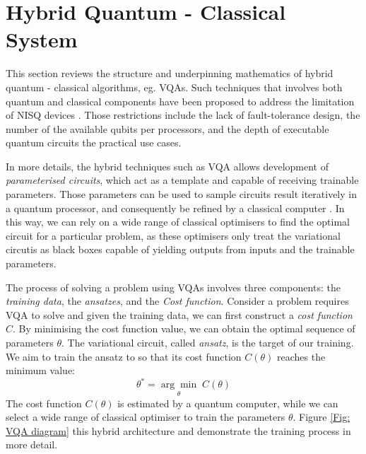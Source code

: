 \section{Hybrid Quantum - Classical System} \label{Sec: Hybrid Quantum - Classical System}

This section reviews the structure and underpinning mathematics of hybrid quantum - classical algorithms, eg. VQAs.
Such techniques that involves both quantum and classical components have been proposed to address the limitation of NISQ devices \cite{brooksQuantumSupremacyHunt2019}.
Those restrictions include the lack of fault-tolerance design, the number of the available qubits per processors, and the depth of executable quantum circuits the practical use cases.

In more details, the hybrid techniques such as VQA allows development of \emph{parameterised circuits}, which act as a template and capable of receiving trainable parameters.
Those parameters can be used to sample circuits result iteratively in a quantum processor, and consequently be refined by a classical computer \cite{cerezo2021variational}.
In this way, we can rely on a wide range of classical optimisers to find the optimal circuit for a particular problem, as these optimisers only treat the variational circutis as black boxes capable of yielding outputs from inputs and the trainable parameters.



The process of solving a problem using VQAs involves three components: the \textit{training data}, the \textit{ansatzes}, and the \textit{Cost function}.
Consider a problem requires VQA to solve and given the training data, we can first construct a \textit{cost function} $C$.
By minimising the cost function value, we can obtain the optimal sequence of parameters $\theta$.
The variational circuit, called \textit{ansatz}, is the target of our training.
We aim to train the ansatz to so that its cost function $C(\theta)$ reaches the minimum value:
\begin{equation}
    \theta^* = \underset{\theta}{\arg \min} \;C(\theta)
    \label{Eqn: optimize theta with ansatz}
\end{equation}
The cost function $C(\theta)$ is estimated by a quantum computer, while we can select a wide range of classical optimiser to train the parameters $\theta$.
Figure \ref{Fig: VQA diagram} this hybrid architecture and demonstrate the training process in more detail.

